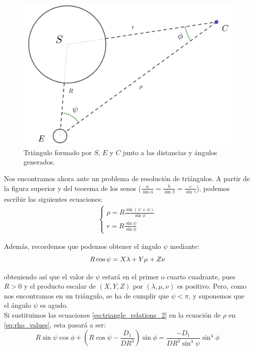 \documentclass[11pt]{article}
\newcommand\ddfrac[2]{\frac{\displaystyle #1}{\displaystyle #2}}
\begin{document}
\begin{figure}[H]
\centering
\includegraphics[scale=0.15]{images/notation_angles.png}
\caption{Triángulo formado por $S$, $E$ y $C$ junto a las distancias y ángulos generados.}
\label{fig:notation_angles}
\end{figure}

Nos encontramos ahora ante un problema de resolución de triángulos. A partir de la figura superior y del teorema de los senos ($\ddfrac{a}{\sin{\alpha}}=\ddfrac{b}{\sin{\beta}}=\ddfrac{c}{\sin{\gamma}}$), podemos escribir las siguientes ecuaciones:
\begin{align}
\left\{
\begin{array}{l}
	\rho=R\ddfrac{\sin{(\psi+\phi)}}{\sin{\phi}}\\
	r=R\ddfrac{\sin{\psi}}{\sin{\phi}}
\end{array}
\right.
\label{eq:triangle_relations_2}
\end{align}

Además, recordemos que podemos obtener el ángulo $\psi$ mediante:
\[
R\cos{\psi}=X\lambda+Y\mu+Z\nu\\
\]

\noindent obteniendo así que el valor de $\psi$ estará en el primer o cuarto cuadrante, pues $R>0$ y el producto escalar de $(X,Y,Z)$ por $(\lambda,\mu,\nu)$ es positivo. Pero, como nos encontramos en un triángulo, se ha de cumplir que $\psi<\pi$, y suponemos que el ángulo $\psi$ es agudo.\\

Si sustituimos las ecuaciones  \eqref{eq:triangle_relations_2} en la ecuación de $\rho$ en \eqref{eq:rho_values}, esta pasará a ser:
\[
R\sin{\psi}\cos{\phi}+\left(R\cos{\psi}-\ddfrac{D_1}{DR^3}\right)\sin{\phi}=\ddfrac{-D_1}{DR^3\sin^3{\psi}}\sin^4{\phi}
\]
\end{document}
